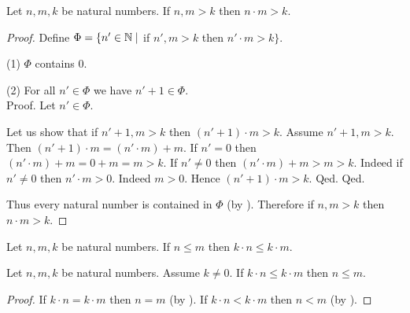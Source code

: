 \documentclass[10pt]{article}
\begin{document}
  \begin{forthel}
    \begin{proposition}
      Let $n, m, k$ be natural numbers.
      If $n, m > k$ then $n \cdot m > k$.
    \end{proposition}
    \begin{proof}
      Define $\Phi = \{ n' \in \mathbb{N} \mid$ if $n', m > k$ then $n' \cdot m > k \}$.

      (1) $\Phi$ contains $0$.

      (2) For all $n' \in \Phi$ we have $n' + 1 \in \Phi$. \\
      Proof.
        Let $n' \in \Phi$.

        Let us show that if $n' + 1, m > k$ then $(n' + 1) \cdot m > k$.
          Assume $n' + 1, m > k$.
          Then $(n' + 1) \cdot m = (n' \cdot m) + m$.
          If $n' = 0$ then
          $(n' \cdot m) + m
            = 0 + m
            = m
            > k$.
          If $n' \neq 0$ then
          $(n' \cdot m) + m
            > m
            > k$.
          Indeed if $n' \neq 0$ then $n' \cdot m > 0$.
          Indeed $m > 0$.
          Hence $(n' + 1) \cdot m > k$.
        Qed.
      Qed.

      Thus every natural number is contained in $\Phi$ (by ).
      Therefore if $n, m > k$ then $n \cdot m > k$.
    \end{proof}
  \end{forthel}

  \begin{forthel}
    \begin{corollary}
      Let $n, m, k$ be natural numbers.
      If $n \leq m$ then $k \cdot n \leq k \cdot m$.
    \end{corollary}
  \end{forthel}

  \begin{forthel}
    \begin{corollary}
      Let $n, m, k$ be natural numbers.
      Assume $k \neq 0$.
      If $k \cdot n \leq k \cdot m$ then $n \leq m$.
    \end{corollary}
    \begin{proof}
      If $k \cdot n = k \cdot m$ then $n = m$ (by ).
      If $k \cdot n < k \cdot m$ then $n < m$ (by ).
    \end{proof}
  \end{forthel}
\end{document}
